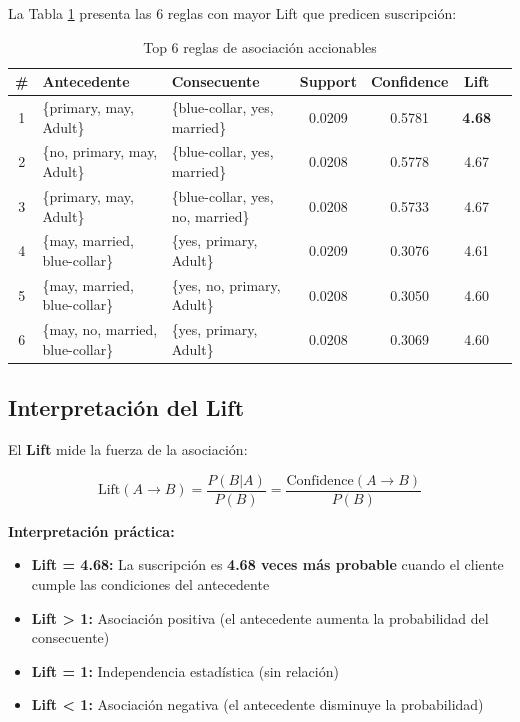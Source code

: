 \documentclass[12pt,letterpaper]{article}
\begin{document}
La Tabla \ref{tab:apriori_rules} presenta las 6 reglas con mayor Lift que predicen suscripción:

\begin{table}[H]
\centering
\caption{Top 6 reglas de asociación accionables}
\label{tab:apriori_rules}
\small
\begin{tabular}{@{}clp{4cm}cccc@{}}
\toprule
\textbf{\#} & \textbf{Antecedente} & \textbf{Consecuente} & \textbf{Support} & \textbf{Confidence} & \textbf{Lift} \\
\midrule
1 & \{primary, may, Adult\} & \{blue-collar, yes, married\} & 0.0209 & 0.5781 & \textbf{4.68} \\
2 & \{no, primary, may, Adult\} & \{blue-collar, yes, married\} & 0.0208 & 0.5778 & 4.67 \\
3 & \{primary, may, Adult\} & \{blue-collar, yes, no, married\} & 0.0208 & 0.5733 & 4.67 \\
4 & \{may, married, blue-collar\} & \{yes, primary, Adult\} & 0.0209 & 0.3076 & 4.61 \\
5 & \{may, married, blue-collar\} & \{yes, no, primary, Adult\} & 0.0208 & 0.3050 & 4.60 \\
6 & \{may, no, married, blue-collar\} & \{yes, primary, Adult\} & 0.0208 & 0.3069 & 4.60 \\
\bottomrule
\end{tabular}
\end{table}

\subsection{Interpretación del Lift}

El \textbf{Lift} mide la fuerza de la asociación:

\begin{equation}
\text{Lift}(A \rightarrow B) = \frac{P(B|A)}{P(B)} = \frac{\text{Confidence}(A \rightarrow B)}{P(B)}
\end{equation}

\textbf{Interpretación práctica:}
\begin{itemize}
    \item \textbf{Lift = 4.68:} La suscripción es \textbf{4.68 veces más probable} cuando el cliente cumple las condiciones del antecedente
    \item \textbf{Lift > 1:} Asociación positiva (el antecedente aumenta la probabilidad del consecuente)
    \item \textbf{Lift = 1:} Independencia estadística (sin relación)
    \item \textbf{Lift < 1:} Asociación negativa (el antecedente disminuye la probabilidad)
\end{itemize}
\end{document}
